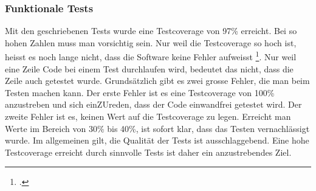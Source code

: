 \subsubsection{Funktionale Tests}
Mit den geschriebenen Tests wurde eine Testcoverage von 97\% erreicht. Bei so hohen Zahlen muss man vorsichtig sein. Nur weil die Testcoverage so hoch ist, heisst es noch lange nicht, dass die Software keine Fehler aufweisst \footcite{test_coverage}. Nur weil eine Zeile Code bei einem Test durchlaufen wird, bedeutet das nicht, dass die Zeile auch getestet wurde. Grundsätzlich gibt es zwei grosse Fehler, die man beim Testen machen kann. Der erste Fehler ist es eine Testcoverage von 100\% anzustreben und sich einZUreden, dass der Code einwandfrei getestet wird. Der zweite Fehler ist es, keinen Wert auf die Testcoverage zu legen. Erreicht man Werte im Bereich von 30\% bis 40\%, ist sofort klar, dass das Testen vernachlässigt wurde. Im allgemeinen gilt, die Qualität der Tests ist ausschlaggebend. Eine hohe Testcoverage erreicht durch sinnvolle Tests ist daher ein anzustrebendes Ziel. 



